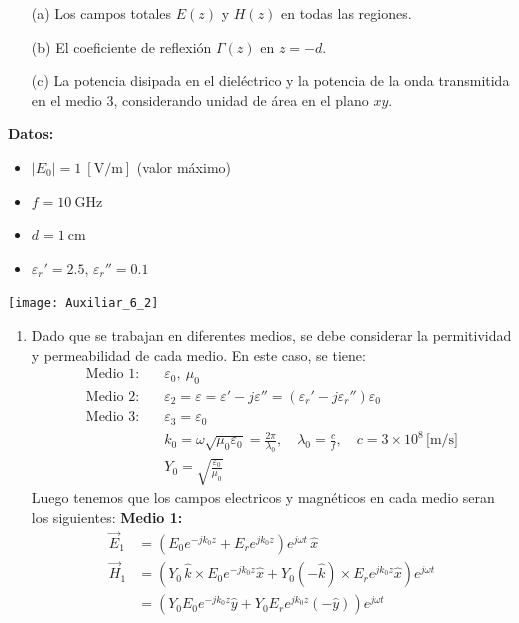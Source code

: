 \documentclass[
  11pt,
  letterpaper,
   addpoints,
   answers
  ]{exam}
\begin{document}
\begin{questions}
    \begin{enumerate}
        \item[(a)] Los campos totales $E(z)$ y $H(z)$ en todas las regiones.
        \item[(b)] El coeficiente de reflexión $\Gamma(z)$ en $z = -d$.
        \item[(c)] La potencia disipada en el dieléctrico y la potencia de la onda transmitida en el medio 3, considerando unidad de área en el plano $xy$.
\end{enumerate}
   
\textbf{Datos:}
\begin{itemize}
    \item $|E_0| = 1~[\mathrm{V/m}]$ (valor máximo)
    \item $f = 10~\mathrm{GHz}$
    \item $d = 1~\mathrm{cm}$
    \item $\varepsilon_r' = 2.5$, \quad $\varepsilon_r'' = 0.1$
\end{itemize}
    \begin{center}
        \texttt{[image: Auxiliar\_6\_2]}
      \end{center}
    \begin{solution}
         \begin{enumerate}
            \item Dado que se trabajan en diferentes medios, se debe considerar la permitividad y permeabilidad de cada medio. En este caso, se tiene:
\begin{align*}
\text{Medio 1:} & \quad \varepsilon_0,\ \mu_0 \\
\text{Medio 2:} & \quad \varepsilon_2 = \varepsilon = \varepsilon' - j \varepsilon'' = (\varepsilon_r' - j \varepsilon_r'') \varepsilon_0 \\
\text{Medio 3:} & \quad \varepsilon_3 = \varepsilon_0 \\
& \quad k_0 = \omega \sqrt{\mu_0 \varepsilon_0} = \frac{2\pi}{\lambda_0}, \quad \lambda_0 = \frac{c}{f}, \quad c = 3 \times 10^8 \,\text{[m/s]} \\
& \quad Y_0 = \sqrt{\frac{\varepsilon_0}{\mu_0}}
\end{align*}
Luego tenemos que los campos electricos y magnéticos en cada medio seran los siguientes:
\textbf{Medio 1:}
\begin{align*}
\vec{E}_1 &= \left( E_0 e^{-j k_0 z} + E_r e^{j k_0 z} \right) e^{j \omega t} \, \hat{x} \\
\vec{H}_1 &= \left( Y_0 \, \hat{k} \times E_0 e^{-j k_0 z} \hat{x} + Y_0 (-\hat{k}) \times E_r e^{j k_0 z} \hat{x} \right) e^{j \omega t} \\
&= \left( Y_0 E_0 e^{-j k_0 z} \hat{y} + Y_0 E_r e^{j k_0 z} (-\hat{y}) \right) e^{j \omega t}
\end{align*}


\end{enumerate}
\end{solution}
\end{questions}
\end{document}
